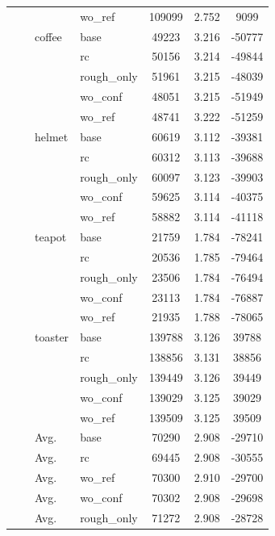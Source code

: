 \begin{table}[t]
{\begin{tabular}{llllccc}
 &  &  & wo\_ref & 109099 & 2.752 & 9099 \\
 &  & coffee & base & 49223 & 3.216 & -50777 \\
 &  &  & rc & 50156 & 3.214 & -49844 \\
 &  &  & rough\_only & 51961 & 3.215 & -48039 \\
 &  &  & wo\_conf & 48051 & 3.215 & -51949 \\
 &  &  & wo\_ref & 48741 & 3.222 & -51259 \\
 &  & helmet & base & 60619 & 3.112 & -39381 \\
 &  &  & rc & 60312 & 3.113 & -39688 \\
 &  &  & rough\_only & 60097 & 3.123 & -39903 \\
 &  &  & wo\_conf & 59625 & 3.114 & -40375 \\
 &  &  & wo\_ref & 58882 & 3.114 & -41118 \\
 &  & teapot & base & 21759 & 1.784 & -78241 \\
 &  &  & rc & 20536 & 1.785 & -79464 \\
 &  &  & rough\_only & 23506 & 1.784 & -76494 \\
 &  &  & wo\_conf & 23113 & 1.784 & -76887 \\
 &  &  & wo\_ref & 21935 & 1.788 & -78065 \\
 &  & toaster & base & 139788 & 3.126 & 39788 \\
 &  &  & rc & 138856 & 3.131 & 38856 \\
 &  &  & rough\_only & 139449 & 3.126 & 39449 \\
 &  &  & wo\_conf & 139029 & 3.125 & 39029 \\
 &  &  & wo\_ref & 139509 & 3.125 & 39509 \\
 & & Avg. & base & 70290 & 2.908 & -29710 \\
 & & Avg. & rc & 69445 & 2.908 & -30555 \\
 & & Avg. & wo\_ref & 70300 & 2.910 & -29700 \\
 & & Avg. & wo\_conf & 70302 & 2.908 & -29698 \\
 & & Avg. & rough\_only & 71272 & 2.908 & -28728 \\
\bottomrule
\end{tabular}}
\end{table}
